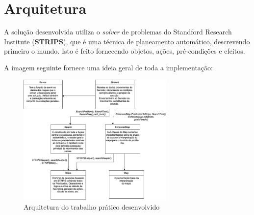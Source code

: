 \documentclass[10pt,portuguese]{article}
\begin{document}
\section{Arquitetura}
\par A solução desenvolvida utiliza o \textit{solver} de problemas do Standford Research Institute (\textbf{STRIPS}), que é uma técnica de planeamento automático, descrevendo primeiro o mundo. Isto é feito fornecendo objetos, ações, pré-condições e efeitos. 

\par A imagem seguinte fornece uma ideia geral de toda a implementação:

    \begin{figure}[!h]
        \centering
        \includegraphics[width=291]{d_diagram.png}
        \caption{Arquitetura do trabalho prático desenvolvido} 
    \end{figure}
\end{document}
